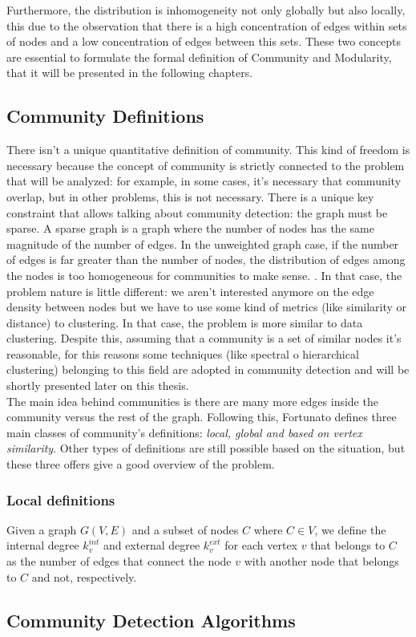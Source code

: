 Furthermore, the distribution is inhomogeneity not only globally but also locally, this due to the observation that there is a high concentration of edges within sets of nodes and a low concentration of edges between this sets. These two concepts are essential to formulate the formal definition of Community and Modularity, that it will be presented in the following chapters. 
\subsection{Community Definitions}
There isn't a unique quantitative definition of community. This kind of freedom is necessary because the concept of community is strictly connected to the problem that will be analyzed: for example, in some cases, it's necessary that community overlap, but in other problems, this is not necessary. There is a unique key constraint that allows talking about community detection: the graph must be sparse. A sparse graph is a graph where the number of nodes has the same magnitude of the number of edges. In the unweighted graph case, if the number of edges is far greater than the number of nodes, the distribution of edges among the nodes is too homogeneous for communities to make sense. \cite{fortunato}. In that case, the problem nature is little different: we aren't interested anymore on the edge density between nodes but we have to use some kind of metrics (like similarity or distance) to clustering. In that case, the problem is more similar to data clustering. Despite this, assuming that a community is a set of similar nodes it's reasonable, for this reasons some techniques (like spectral o hierarchical clustering) belonging to this field are adopted in community detection and will be shortly presented later on this thesis.\\
The main idea behind communities is there are many more edges inside the community versus the rest of the graph. 
Following this, Fortunato \cite{fortunato} defines three main classes of community's definitions: \textit{local, global and based on vertex similarity}. Other types of definitions are still possible based on the situation, but these three offers give a good overview of the problem. \\
\subsubsection{Local definitions}
Given a graph $G(V,E)$ and a subset of nodes $C$ where $C \in V$, we define the internal degree $k_v^{int}$ and external degree $k_v^{ext}$ for each vertex $v$ that belongs to $C$ as the number of edges that connect the node $v$ with another node that belongs to $C$ and not, respectively. 
\subsection{Community Detection Algorithms}